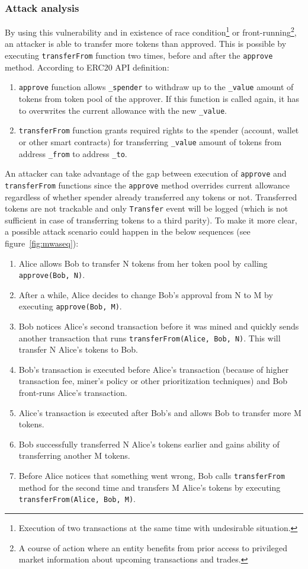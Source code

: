 \subsubsection{Attack analysis}
By using this vulnerability and in existence of race condition\footnote{Execution of two transactions at the same time with undesirable situation.} or front-running\footnote{A course of action where an entity benefits from prior access to privileged market information	about upcoming transactions and trades\cite{eskandari2019sok}.}, an attacker is able to transfer more tokens than approved. This is possible by executing \texttt{transferFrom} function two times, before and after the \texttt{approve} method. According to ERC20 API definition\cite{ERC20Std}:
\begin{enumerate}
	\item \texttt{approve} function allows \texttt{\_spender} to withdraw up to the \texttt{\_value} amount of tokens from token pool of the approver. If this function is called again, it has to overwrites the current allowance with the new \texttt{\_value}.
	\item \texttt{transferFrom} function grants required rights to the spender (account, wallet or other smart contracts) for transferring \texttt{\_value} amount of tokens from address \texttt{\_from} to address \texttt{\_to}.
\end{enumerate}
An attacker can take advantage of the gap between execution of \texttt{approve} and \texttt{transferFrom} functions since the \texttt{approve} method overrides current allowance regardless of whether spender already transferred any tokens or not. Transferred tokens are not trackable and only \texttt{Transfer} event will be logged (which is not sufficient in case of transferring tokens to a third parity). To make it more clear, a possible attack scenario could happen in the below sequences (see figure~\ref{fig:mwaseq}):
\begin{enumerate}
	\item Alice allows Bob to transfer N tokens from her token pool by calling \texttt{approve(Bob, N)}.
	\item After a while, Alice decides to change Bob's approval from N to M by executing \texttt{approve(Bob, M)}.
	\item Bob notices Alice’s second transaction before it was mined and quickly sends another transaction that runs \texttt{transferFrom(Alice, Bob, N)}. This will transfer N Alice’s tokens to Bob.
	\item Bob’s transaction is executed before Alice’s transaction (because of higher transaction fee, miner’s policy or other prioritization techniques) and Bob front-runs Alice’s transaction.
	\item Alice’s transaction is executed after Bob’s and allows Bob to transfer more M tokens.
	\item Bob successfully transferred N Alice’s tokens earlier and gains ability of transferring another M tokens.
	\item Before Alice notices that something went wrong, Bob calls \texttt{transferFrom} method for the second time and transfers M Alice’s tokens by executing \texttt{transferFrom(Alice, Bob, M)}.
\end{enumerate}

